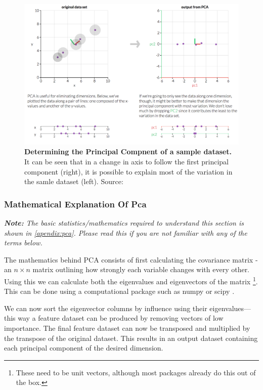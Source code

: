 \begin{figure}[H]
    \centering
    \includegraphics[width=\textwidth]{./4fig/pca2d.png}
    \caption{\textbf{Determining the Principal Compnent of a sample dataset.} It can be seen that in a change in axis to follow the first principal component (right), it is possible to explain most of the variation in the samle dataset (left). Source: \citep{pcaim}}
    \label{fig:2dpca}
\end{figure}


\subsubsection{Mathematical Explanation Of Pca}
\emph{\textbf{Note:} The basic statistics/mathematics required to understand this section is shown in \autoref{apendix:pca}. Please read this if you are not familiar with any of the terms below.
}

The mathematics behind PCA consists of first calculating the covariance matrix - an $n \times n$ matrix outlining how strongly each variable changes with every other. Using this we can calculate both the eigenvalues and eigenvectors of the matrix \footnote{These need to be unit vectors, although most packages already do this out of the box.}. This can be done using a computational package such as numpy or scipy \citep{numpy,scipy}.

We can now sort the eigenvector columns by influence using their eigenvalues—this way a feature dataset can be produced by removing vectors of low importance. The final feature dataset can now be transposed and multiplied by the transpose of the original dataset. This results in an output dataset containing each principal component of the desired dimension.



